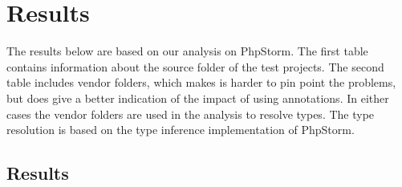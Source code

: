 \documentclass[main.tex]{subfiles}
\begin{document}
    \chapter{Results}\label{ch:results}
    The results below are based on our analysis on PhpStorm.
    The first table contains information about the source folder of the test projects.
    The second table includes vendor folders, which makes is harder to pin point the problems, but does give a better indication of the impact of using annotations.
    In either cases the vendor folders are used in the analysis to resolve types.
    The type resolution is based on the type inference implementation of PhpStorm.
    
    \section{Results}
    
    
    
    
    
    
    
\end{document}
